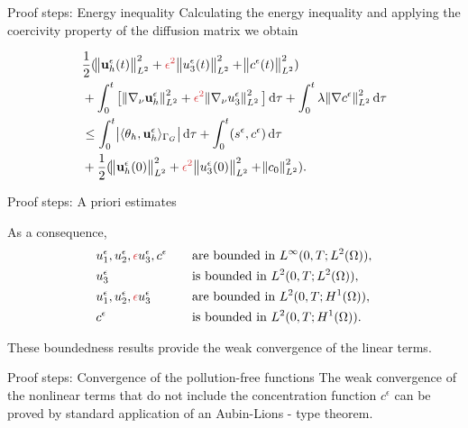 \documentclass{beamer}
\newcommand*\diff{\mathop{}\!\mathrm{d}}
\begin{document}
\begin{frame}{Proof steps: Energy inequality}
Calculating the energy inequality and applying the coercivity property of the diffusion matrix we obtain

  \begin{equation} \nonumber
    \begin{split}  
    & \frac{1}{2} (\norm{\mathbf{u}_h^\epsilon (t)}_{L^2}^2 + \textcolor{jasper}{\epsilon^2} \norm{u_3^\epsilon (t)}_{L^2}^2 + \norm{c^\epsilon (t)}_{L^2}^2) \\
    & + \int_0 ^ t \big [\norm{\nabla_\nu \mathbf{u}_h^\epsilon}_{L^2}^2 + \textcolor{jasper}{\epsilon^2} \norm{\nabla_\nu u_3^\epsilon}_{L^2}^2 \big ] \diff \tau + \int_0 ^ t \lambda \norm{\nabla c^\epsilon}_{L^2}^2 \diff \tau \\
    & \leq \int_0^t \abs{\langle \theta_h, \mathbf{u}^\epsilon_h \rangle_{\Gamma_G}} \diff \tau + \int_0^t (s^\epsilon,c^\epsilon) \diff \tau \\
    & + \frac{1}{2} (\norm{\mathbf{u}_h^\epsilon (0)}_{L^2}^2 + \textcolor{jasper}{\epsilon^2} \norm{u_3^\epsilon (0)}_{L^2}^2 + \norm{c_0}_{L^2}^2).
    \end{split}
  \end{equation}
\end{frame}

\begin{frame}{Proof steps: A priori estimates}

As a consequence,
\begin{align}
& u^\epsilon_1, u^\epsilon_2, \textcolor{jasper}{\epsilon} u^\epsilon_3, c^\epsilon & \quad & \text{are bounded in $L^\infty (0,T; L^2(\Omega)),$} \nonumber \\
& u^\epsilon_3 & \quad & \text{is bounded in $L^2 (0,T; L^2(\Omega)),$} \nonumber \\
& u^\epsilon_1, u^\epsilon_2, \textcolor{jasper}{\epsilon} u^\epsilon_3 & \quad & \text{are bounded in $L^2(0,T; H^1(\Omega)),$} \nonumber \\
& c^\epsilon & \quad & \text{is bounded in $L^2(0,T;H^1(\Omega)).$} \nonumber
\end{align}

These boundedness results provide the weak convergence of the linear terms.
\end{frame}

\begin{frame}{Proof steps: Convergence of the pollution-free functions}
The weak convergence of the nonlinear terms that do not include the concentration function $c^\epsilon$ can be proved by standard application of an Aubin-Lions - type theorem.
\end{frame}
\end{document}
